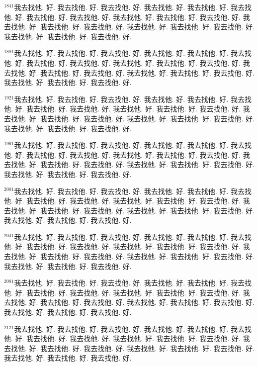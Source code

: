 \documentclass{book}
\begin{document}
$^{1841}$我去找他.
好.
我去找他.
好.
我去找他.
好.
我去找他.
好.
我去找他.
好.
我去找他.
好.
我去找他.
好.
我去找他.
好.
我去找他.
好.
我去找他.
好.
我去找他.
好.
我去找他.
好.
我去找他.
好.
我去找他.
好.
我去找他.
好.
我去找他.
好.
我去找他.
好.
我去找他.
好.
我去找他.
好.
我去找他.
好.

$^{1881}$我去找他.
好.
我去找他.
好.
我去找他.
好.
我去找他.
好.
我去找他.
好.
我去找他.
好.
我去找他.
好.
我去找他.
好.
我去找他.
好.
我去找他.
好.
我去找他.
好.
我去找他.
好.
我去找他.
好.
我去找他.
好.
我去找他.
好.
我去找他.
好.
我去找他.
好.
我去找他.
好.
我去找他.
好.
我去找他.
好.

$^{1921}$我去找他.
好.
我去找他.
好.
我去找他.
好.
我去找他.
好.
我去找他.
好.
我去找他.
好.
我去找他.
好.
我去找他.
好.
我去找他.
好.
我去找他.
好.
我去找他.
好.
我去找他.
好.
我去找他.
好.
我去找他.
好.
我去找他.
好.
我去找他.
好.
我去找他.
好.
我去找他.
好.
我去找他.
好.
我去找他.
好.

$^{1961}$我去找他.
好.
我去找他.
好.
我去找他.
好.
我去找他.
好.
我去找他.
好.
我去找他.
好.
我去找他.
好.
我去找他.
好.
我去找他.
好.
我去找他.
好.
我去找他.
好.
我去找他.
好.
我去找他.
好.
我去找他.
好.
我去找他.
好.
我去找他.
好.
我去找他.
好.
我去找他.
好.
我去找他.
好.
我去找他.
好.

$^{2001}$我去找他.
好.
我去找他.
好.
我去找他.
好.
我去找他.
好.
我去找他.
好.
我去找他.
好.
我去找他.
好.
我去找他.
好.
我去找他.
好.
我去找他.
好.
我去找他.
好.
我去找他.
好.
我去找他.
好.
我去找他.
好.
我去找他.
好.
我去找他.
好.
我去找他.
好.
我去找他.
好.
我去找他.
好.
我去找他.
好.

$^{2041}$我去找他.
好.
我去找他.
好.
我去找他.
好.
我去找他.
好.
我去找他.
好.
我去找他.
好.
我去找他.
好.
我去找他.
好.
我去找他.
好.
我去找他.
好.
我去找他.
好.
我去找他.
好.
我去找他.
好.
我去找他.
好.
我去找他.
好.
我去找他.
好.
我去找他.
好.
我去找他.
好.
我去找他.
好.
我去找他.
好.

$^{2081}$我去找他.
好.
我去找他.
好.
我去找他.
好.
我去找他.
好.
我去找他.
好.
我去找他.
好.
我去找他.
好.
我去找他.
好.
我去找他.
好.
我去找他.
好.
我去找他.
好.
我去找他.
好.
我去找他.
好.
我去找他.
好.
我去找他.
好.
我去找他.
好.
我去找他.
好.
我去找他.
好.
我去找他.
好.
我去找他.
好.

$^{2121}$我去找他.
好.
我去找他.
好.
我去找他.
好.
我去找他.
好.
我去找他.
好.
我去找他.
好.
我去找他.
好.
我去找他.
好.
我去找他.
好.
我去找他.
好.
我去找他.
好.
我去找他.
好.
我去找他.
好.
我去找他.
好.
我去找他.
好.
我去找他.
好.
我去找他.
好.
我去找他.
好.
我去找他.
好.
我去找他.
好.
\end{document}

